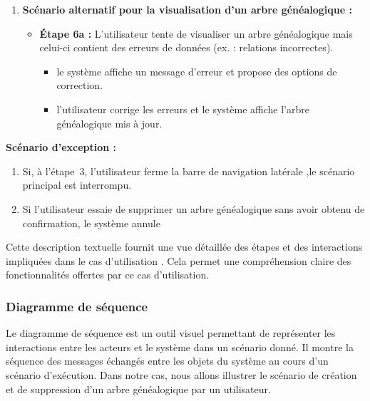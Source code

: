 \begin{enumerate}
    \item \textbf{Scénario alternatif pour la visualisation d'un arbre généalogique :}
    \begin{itemize}
        \item \textbf{Étape 6a :} L'utilisateur tente de visualiser un arbre
          généalogique mais celui-ci contient des erreurs de données (ex. : relations incorrectes).
        \begin{itemize}
            \item le système affiche un message d'erreur et propose des options de correction.
            \item l'utilisateur corrige les erreurs et le système affiche l'arbre généalogique mis à jour.
        \end{itemize}
    \end{itemize}

\end{enumerate}

\textbf{Scénario d'exception :}
\begin{enumerate}
  \item Si, à l’étape 3, l’utilisateur ferme la barre de navigation latérale
    ,le scénario principal est interrompu.

  \item Si l’utilisateur essaie de supprimer un arbre généalogique sans avoir
    obtenu de confirmation, le système annule
\end{enumerate}

Cette description textuelle fournit une vue détaillée des étapes et des
interactions impliquées dans le cas d’utilisation .
Cela permet une compréhension claire des fonctionnalités offertes par ce cas
d’utilisation.


\subsubsection{Diagramme de séquence}

Le diagramme de séquence est un outil visuel permettant de représenter les
interactions entre les acteurs et le système dans un scénario donné. Il montre
la séquence des messages échangés entre les objets du système au cours d’un
scénario d’exécution. Dans notre cas, nous allons illustrer le scénario de
création et de suppression d’un arbre généalogique par un utilisateur.




